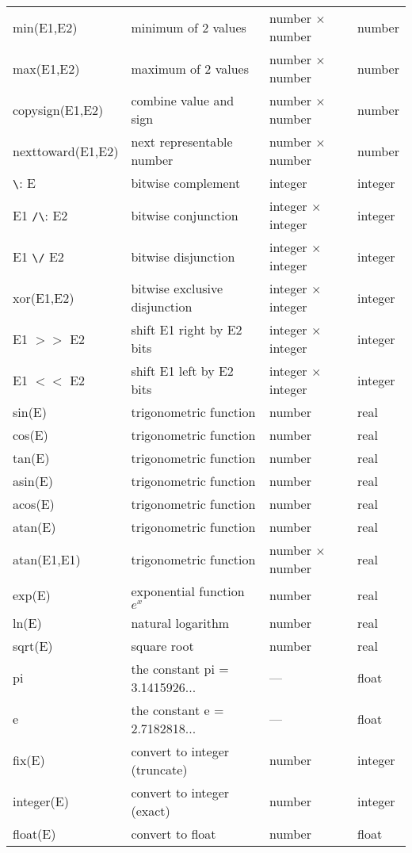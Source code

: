 {\begin{tabular}{l l l l}
min(E1,E2) & minimum of 2 values & number $\times$ number & number \\
max(E1,E2) & maximum of 2 values & number $\times$ number & number \\
copysign(E1,E2) & combine value and sign & number $\times$ number & number \\
nexttoward(E1,E2) & next representable number & number $\times$ number & number \\
\verb:\: E & bitwise complement & integer & integer \\
E1 \verb:/\: E2  & bitwise conjunction & integer $\times$ integer & integer \\
E1 \verb:\/: E2 & bitwise disjunction & integer $\times$ integer & integer \\
xor(E1,E2) & bitwise exclusive disjunction & integer $\times$ integer & integer \\
E1 $>>$ E2 & shift E1 right by E2 bits & integer $\times$ integer & integer \\
E1 $<<$ E2 & shift E1 left by E2 bits & integer $\times$ integer & integer \\
sin(E)     & trigonometric function & number & real \\
cos(E)     & trigonometric function & number & real \\
tan(E)     & trigonometric function & number & real \\
asin(E)    & trigonometric function & number & real \\
acos(E)    & trigonometric function & number & real \\
atan(E)    & trigonometric function & number & real \\
atan(E1,E1) & trigonometric function & number $\times$ number & real \\
exp(E)     & exponential function \( e^{x} \) & number & real \\
ln(E)      & natural logarithm & number & real \\
sqrt(E)    & square root & number & real \\
pi         & the constant pi = 3.1415926...  & --- & float \\
e          & the constant e = 2.7182818... & --- & float \\
fix(E)     & convert to integer (truncate) & number & integer \\
integer(E) & convert to integer (exact) & number & integer \\
float(E)   & convert to float & number & float \\

\end{tabular}}
